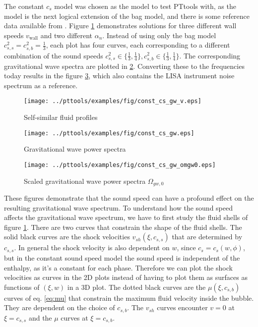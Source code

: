 The constant $c_s$ model was chosen as the model to test PTtools with,
as the model is the next logical extension of the bag model,
and there is some reference data available from \cites{giese_2020}{giese_2021}.
Figure \ref{fig:fluid_profiles} demonstrates solutions for three different wall speeds $v_\text{wall}$ and two different $\alpha_n$.
Instead of using only the bag model $c_{s,s}^2 = c_{s,b}^2 = \frac{1}{3}$,
each plot has four curves, each corresponding to a different combination of the sound speeds
$c_{s,s}^2 \in \{ \frac{1}{3}, \frac{1}{4} \}, c_{s,b}^2 \in \{ \frac{1}{3}, \frac{1}{4} \}$.
The corresponding gravitational wave spectra are plotted in \ref{fig:gw_spectra}.
Converting these to the frequencies today results in the figure \ref{fig:omgw0},
which also contains the LISA instrument noise spectrum as a reference.

\begin{figure}[ht!]
\centering
\texttt{[image: ../pttools/examples/fig/const\_cs\_gw\_v.eps]}
\caption{Self-similar fluid profiles}
\label{fig:fluid_profiles}
\end{figure}

\begin{figure}[ht!]
\centering
\texttt{[image: ../pttools/examples/fig/const\_cs\_gw.eps]}
\caption{Gravitational wave power spectra}
\label{fig:gw_spectra}
\end{figure}

\begin{figure}[ht!]
\centering
\texttt{[image: ../pttools/examples/fig/const\_cs\_gw\_omgw0.eps]}
\caption{Scaled gravitational wave power spectra $\Omega_{gw,0}$}
\label{fig:omgw0}
\end{figure}

These figures demonstrate that the sound speed can have a profound effect on the resulting gravitational wave spectrum.
To understand how the sound speed affects the gravitational wave spectrum,
we have to first study the fluid shells of figure \ref{fig:fluid_profiles}.
There are two curves that constrain the shape of the fluid shells.
The solid black curves are the shock velocities $v_{sh}(\xi,c_{s,s})$ that are determined by $c_{s,s}$.
In general the shock velocity is also dependent on $w$, since $c_s = c_s(w,\phi)$,
but in the constant sound speed model the sound speed is independent of the enthalpy,
as it's a constant for each phase.
Therefore we can plot the shock velocities as curves in the 2D plots instead of having to plot them as surfaces as functions of $(\xi,w)$ in a 3D plot.
The dotted black curves are the $\mu(\xi,c_{s,b})$ curves of eq. \eqref{eq:mu} that constrain the maximum fluid velocity inside the bubble.
They are dependent on the choice of $c_{s,b}$.
The $v_{sh}$ curves encounter $v=0$ at $\xi = c_{s,s}$ and the $\mu$ curves at $\xi = c_{s,b}$.

